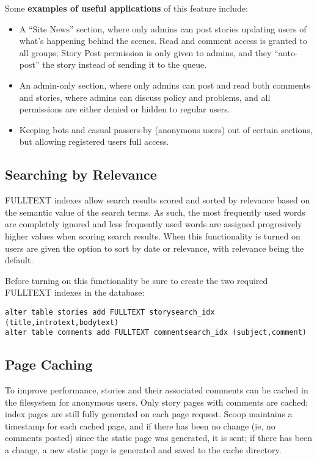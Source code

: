 Some {\bf examples of useful applications} of this feature include: 

\begin{itemize}
\item A ``Site News'' section, where only admins can post stories updating users of what's happening behind the scenes.  Read and comment access is granted to all groups; Story Post permission is only given to admins, and they ``auto-post'' the story instead of sending it to the queue.
\item An admin-only section, where only admins can post and read both comments and stories, where admins can discuss policy and problems, and all permissions are either denied or hidden to regular users.
\item Keeping bots and casual passers-by (anonymous users) out of certain sections, but allowing registered users full access.
\end{itemize}

\subsection{Searching by Relevance}
\label{features-fulltext}

FULLTEXT indexes allow search results scored and sorted by relevance based on the semantic value of the search terms. As such, the most frequently used words are completely ignored and less frequently used words are assigned progresively higher values when scoring search results. When this functionality is turned on users are given the option to sort by date or relevance, with relevance being the default.

Before turning on this functionality be sure to create the two required FULLTEXT indexes in the database:
\begin{verbatim}
alter table stories add FULLTEXT storysearch_idx (title,introtext,bodytext)
alter table comments add FULLTEXT commentsearch_idx (subject,comment)
\end{verbatim}

\subsection{Page Caching}
\label{features-static-page-caching}

To improve performance, stories and their associated comments can be cached in the filesystem for anonymous users.  Only story pages with comments are cached; index pages are still fully generated on each page request.  Scoop maintains a timestamp for each cached page, and if there has been no change (ie, no comments posted) since the static page was generated, it is sent; if there has been a change, a new static page is generated and saved to the cache directory.

